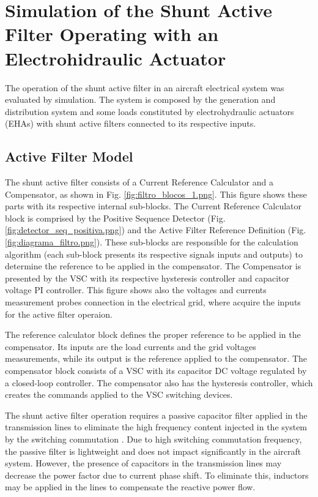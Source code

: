 \section{Simulation of the Shunt Active Filter Operating with an Electrohidraulic Actuator}

The operation of the shunt active filter in an aircraft electrical system was evaluated by simulation. The system is composed by the generation and distribution system and some loads constituted by electrohydraulic actuators (EHAs) with shunt active filters connected to its respective inputs.

\subsection{Active Filter Model}

The shunt active filter consists of a Current Reference Calculator and a Compensator, as shown in Fig. \ref{fig:filtro_blocos_1.png}. This figure shows these parts with its respective internal sub-blocks. The Current Reference Calculator block is comprised by the Positive Sequence Detector (Fig. \ref{fig:detector_seq_positiva.png}) and the Active Filter Reference Definition (Fig. \ref{fig:diagrama_filtro.png}). These sub-blocks are responsible for the calculation algorithm (each sub-block presents its respective signals inputs and outputs) to determine the reference to be applied in the compensator. The Compensator is presented by the VSC with its respective hysteresis controller and capacitor voltage PI controller. This figure shows also the voltages and currents measurement probes connection in the electrical grid, where acquire the inputs for the active filter operaion.

The reference calculator block defines the proper reference to be applied in the compensator. Its inputs are the load currents and the grid voltages measurements, while its output is the reference applied to the compensator. The compensator block consists of a VSC with its capacitor DC voltage regulated by a closed-loop controller. The compensator also has the hysteresis controller, which creates the commands applied to the VSC switching devices.

The shunt active filter operation requires a passive capacitor filter applied in the transmission lines to eliminate the high frequency content injected in the system by the switching commutation \citep{Akagi2007}. Due to high switching commutation frequency, the passive filter is lightweight and does not impact significantly in the aircraft system. However, the presence of capacitors in the transmission lines may decrease the power factor due to current phase shift. To eliminate this, inductors may be applied in the lines to compensate the reactive power flow.

